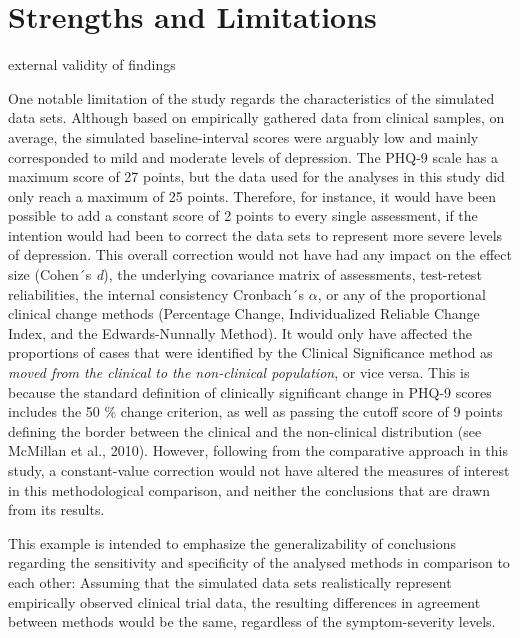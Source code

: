 \documentclass[12pt,twoside]{reedthesis}
\begin{document}
\hypertarget{strengths-and-limitations}{%
\section{Strengths and Limitations}\label{strengths-and-limitations}}

external validity of findings

\par

One notable limitation of the study regards the characteristics of the simulated data sets. Although based on empirically gathered data from clinical samples, on average, the simulated baseline-interval scores were arguably low and mainly corresponded to mild and moderate levels of depression. The PHQ-9 scale has a maximum score of 27 points, but the data used for the analyses in this study did only reach a maximum of 25 points. Therefore, for instance, it would have been possible to add a constant score of 2 points to every single assessment, if the intention would had been to correct the data sets to represent more severe levels of depression. This overall correction would not have had any impact on the effect size (Cohen´s \emph{d}), the underlying covariance matrix of assessments, test-retest reliabilities, the internal consistency Cronbach´s \(\alpha\), or any of the proportional clinical change methods (Percentage Change, Individualized Reliable Change Index, and the Edwards-Nunnally Method). It would only have affected the proportions of cases that were identified by the Clinical Significance method as \emph{moved from the clinical to the non-clinical population}, or vice versa. This is because the standard definition of clinically significant change in PHQ-9 scores includes the 50 \% change criterion, as well as passing the cutoff score of 9 points defining the border between the clinical and the non-clinical distribution (see McMillan et al., 2010). However, following from the comparative approach in this study, a constant-value correction would not have altered the measures of interest in this methodological comparison, and neither the conclusions that are drawn from its results.

\par

This example is intended to emphasize the generalizability of conclusions regarding the sensitivity and specificity of the analysed methods in comparison to each other: Assuming that the simulated data sets realistically represent empirically observed clinical trial data, the resulting differences in agreement between methods would be the same, regardless of the symptom-severity levels.
\end{document}
